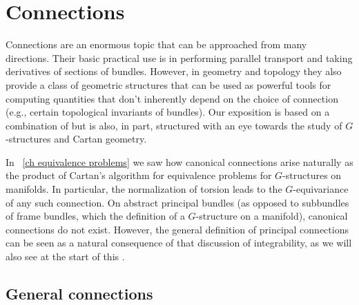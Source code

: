 \chapter{Connections}\label{ch: connections}

Connections are an enormous topic that can be approached from many directions. Their basic practical use is in performing parallel transport and taking derivatives of sections of bundles. However, in geometry and topology they also provide a class of geometric structures that can be used as powerful tools for computing quantities that don't inherently depend on the choice of connection (e.g., certain topological invariants of bundles). Our exposition is based on a combination of \cite{Vakar,RS2,Kolar} but is also, in part, structured with an eye towards the study of $G$-structures and Cartan geometry.

\begin{intu*}
    In \Chap~\ref{ch equivalence problems} we saw how canonical connections arise naturally as the product of Cartan's algorithm for equivalence problems for $G$-structures on manifolds. In particular, the normalization of torsion leads to the $G$-equivariance of any such connection. On abstract principal bundles (as opposed to subbundles of frame bundles, which the definition of a $G$-structure on a manifold), canonical connections do not exist. However, the general definition of principal connections can be seen as a natural consequence of that discussion of integrability, as we will also see at the start of this \chap.
\end{intu*}

\section{General connections}\label{sec general connections}

